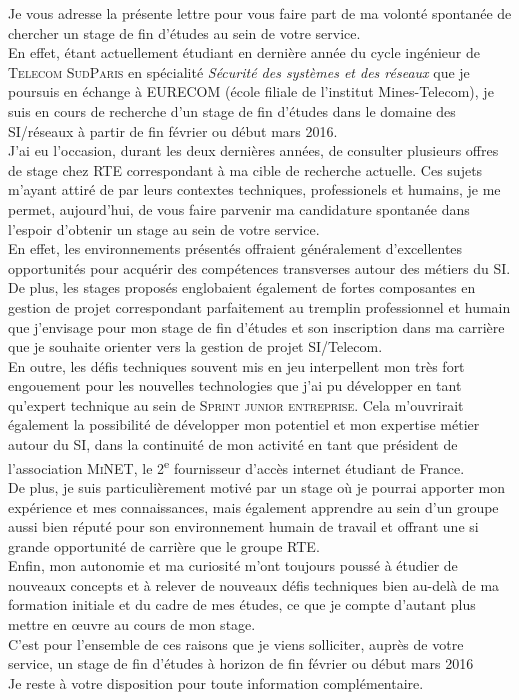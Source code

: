 \documentclass[10pt,a4paper,roman]{moderncv} %
\begin{document}
\quad \quad Je vous adresse la présente lettre pour vous faire part de ma volonté spontanée de chercher un stage de fin d'études au sein de votre
service.\\[0.3cm]
\quad \quad En effet, étant actuellement étudiant en dernière année du cycle ingénieur de \textsc{Telecom SudParis} en spécialité
\textit{Sécurité des systèmes et des réseaux} que je poursuis en échange à EURECOM (école filiale de l'institut Mines-Telecom), je suis en cours
de recherche d'un stage de fin d'études dans le domaine des SI/réseaux à partir de fin février ou début mars 2016.\\[0.3cm]
\quad \quad J'ai eu l'occasion, durant les deux dernières années, de consulter plusieurs offres de stage chez RTE correspondant à ma cible de recherche actuelle.
Ces sujets m'ayant attiré de par leurs contextes techniques, professionels et humains, je me permet, aujourd'hui, de vous
faire parvenir ma candidature spontanée dans l'espoir d'obtenir un stage au sein de votre service.\\
En effet, les environnements présentés offraient généralement d'excellentes opportunités pour acquérir des compétences transverses autour des
métiers du SI. De plus, les stages proposés englobaient également de fortes composantes en gestion de projet correspondant parfaitement au tremplin
professionnel et humain que j’envisage pour mon stage de fin d’études et son inscription dans ma carrière que je souhaite orienter vers la
gestion de projet SI/Telecom.\\
En outre, les défis techniques souvent mis en jeu interpellent mon très fort engouement pour les nouvelles technologies que j'ai pu
développer en tant qu'expert technique au sein de \textsc{Sprint junior entreprise}. Cela m'ouvrirait également la possibilité de développer mon
potentiel et mon expertise métier autour du SI, dans la continuité de mon activité en tant que président de l'association \textsc{MiNET},
le 2\textsuperscript{e} fournisseur d'accès internet étudiant de France.\\
De plus, je suis particulièrement motivé par un stage où je pourrai apporter mon expérience et mes connaissances, mais également
apprendre au sein d'un groupe aussi bien réputé pour son environnement humain de travail et offrant une si grande opportunité
de carrière que le groupe \textsc{RTE}.\\
Enfin, mon autonomie et ma curiosité m'ont toujours poussé à étudier de nouveaux concepts et à relever de nouveaux défis techniques bien au-delà de ma
formation initiale et du cadre de mes études, ce que je compte d'autant plus mettre en \oe uvre au cours de mon stage.\\
C'est pour l'ensemble de ces raisons que je viens solliciter, auprès de votre service, un stage de fin d'études à horizon de fin février
ou début mars 2016\\[0.3cm]
Je reste à votre disposition pour toute information complémentaire. \\[1cm]

\makeletterclosing %

\end{document}
